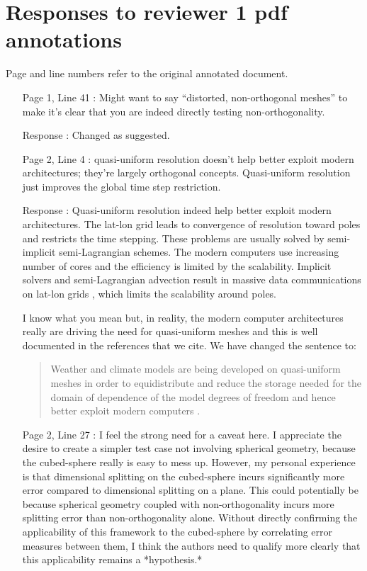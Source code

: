\documentclass[12pt]{article}
\begin{document}
\section*{Responses to reviewer 1 pdf annotations}

Page and line numbers refer to the original annotated document.

\begin{enumerate}
\item [Page 1, Line 41]: Might want to say ``distorted, non-orthogonal meshes'' to make it's clear that you are indeed directly testing non-orthogonality.

\item [Response]: Changed as suggested.

\item [Page 2, Line 4]: quasi-uniform resolution doesn't help better exploit modern architectures; they're largely orthogonal concepts. Quasi-uniform resolution just improves the global time step restriction.

\item [Response]: Quasi-uniform resolution indeed help better exploit modern architectures. The lat-lon grid leads to convergence of resolution toward poles and restricts the time stepping. These problems are usually solved by semi-implicit semi-Lagrangian schemes. The modern computers use increasing number of cores and the efficiency is limited by the scalability. Implicit solvers and semi-Lagrangian advection result in massive data communications on lat-lon grids \citep{ST12}, which limits the scalability around poles. 

I know what you mean but, in reality, the modern computer architectures really are driving the need for quasi-uniform meshes and this is well documented in the references that we cite. We have changed the sentence to:
\begin{quote}
Weather and climate models are being developed on quasi-uniform meshes in order to equidistribute and reduce the storage needed for the domain of dependence of the model degrees of freedom and hence better exploit modern computers \cite[eg][]{WTC12,LUJ+14,ST12,SG11,KNK15}.
\end{quote}

\item [Page 2, Line 27]: I feel the strong need for a caveat here. I appreciate the desire to create a simpler test case not involving spherical geometry, because the cubed-sphere really is easy to mess up. However, my personal experience is that dimensional splitting  on the cubed-sphere incurs significantly more error compared to dimensional splitting on a plane. This could potentially be because spherical geometry coupled with non-orthogonality incurs more splitting error than non-orthogonality alone. Without directly confirming the applicability of this framework to the cubed-sphere by correlating error measures between them, I think the authors need to qualify more clearly that this applicability remains a *hypothesis.*


\end{enumerate}
\end{document}
